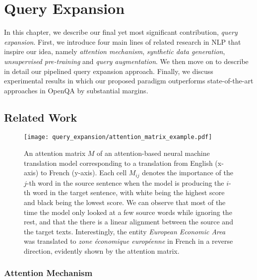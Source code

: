 
\chapter{Query Expansion} %
\label{ch:query_expansion}

%
In this chapter, we describe our final yet most significant contribution, \emph{query expansion}.
%
First, we introduce four main lines of related research in NLP that inspire our idea, namely \emph{attention mechanism}, \emph{synthetic data generation}, \emph{unsupervised pre-training} and \emph{query augmentation}.
%
We then move on to describe in detail our pipelined query expansion approach.
%
Finally, we discuss experimental results in which our proposed paradigm outperforms state-of-the-art approaches in OpenQA by substantial margins.


\section{Related Work}
\label{sec:query_expansion_related_work}


\begin{figure}[!htbp]
	\centering
	\texttt{[image: query\_expansion/attention\_matrix\_example.pdf]}
	\caption[Illustration of the attention mechanism via the score matrix of an attention-based neural machine translation model.]{
		An attention matrix $M$ of an attention-based neural machine translation model corresponding to a translation from English (x-axis) to French (y-axis).
		Each cell $M_{ij}$ denotes the importance of the $j$-th word in the source sentence when the model is producing the $i$-th word in the target sentence, with white being the highest score and black being the lowest score.
		We can observe that most of the time the model only looked at a few source words while ignoring the rest, and that the there is a linear alignment between the source and the target texts.
		Interestingly, the entity \emph{European Economic Area} was translated to \emph{zone économique européenne} in French in a reverse direction, evidently shown by the attention matrix.
	}
	\label{fig:attention_illustration}
\end{figure}


\subsection{Attention Mechanism}
\label{sec:related_attention}

